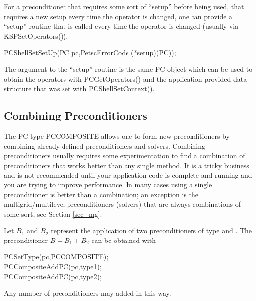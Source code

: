 For a preconditioner that requires some sort of ``setup'' before being used,
that requires a new setup every time the operator is changed, one can
provide a ``setup'' routine that is called every time the operator is
changed (usually via KSPSetOperators()).
\begin{tabbing}
  PCShellSetSetUp(PC pc,PetscErrorCode (*setup)(PC));
\end{tabbing}
The argument to the ``setup'' routine is the same PC object which
can be used to obtain the operators with PCGetOperators() and the
application-provided data structure that was set with PCShellSetContext().

\subsection{Combining Preconditioners\label{sec:combining-pcs}} 

The PC type PCCOMPOSITE  allows one to form
new preconditioners by combining already defined preconditioners and
solvers. Combining preconditioners usually requires some experimentation
to find a combination of preconditioners that works better than any
single method. It is a tricky business and is not recommended until
your application code is complete and running and you are trying to
improve performance. In many cases using a single preconditioner is better
than a combination; an exception is the multigrid/multilevel preconditioners
(solvers) that are always combinations of some sort, see Section \ref{sec_mg}.

Let $B_1$ and $B_2$ represent the application of two
preconditioners of type  and . The preconditioner
$ B = B_1 + B_2 $ can be obtained with
\begin{tabbing}
  PCSetType(pc,PCCOMPOSITE);\\
  PCCompositeAddPC(pc,type1);\\
  PCCompositeAddPC(pc,type2);
\end{tabbing}
Any number of preconditioners may added in this way.

